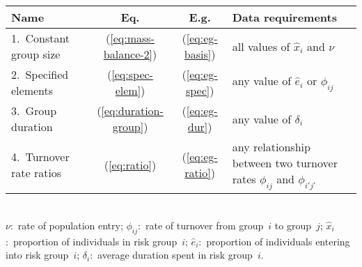 \begin{tabular}{lccl}
  \toprule
  Name                    &            Eq.            &        E.g.         & Data requirements                                                         \\
  \midrule
  1.~Constant group size  & (\ref{eq:mass-balance-2}) & (\ref{eq:eg-basis}) & all values of $\hat{x}_i$ and $\nu$                                       \\
  2.~Specified elements   &   (\ref{eq:spec-elem})    & (\ref{eq:eg-spec})  & any value of $\hat{e}_i$ or $\phi_{ij}$                                   \\
  3.~Group duration       & (\ref{eq:duration-group}) &  (\ref{eq:eg-dur})  & any value of $\delta_i$                                                   \\
  4.~Turnover rate ratios &     (\ref{eq:ratio})      & (\ref{eq:eg-ratio}) & any relationship between two turnover rates $\phi_{ij}$ and $\phi_{i'j'}$ \\
  \bottomrule
\end{tabular}\\[1em]
\footnotesize\flushleft
$\nu$:~rate of population entry;
$\phi_{ij}$:~rate of turnover from group~$i$ to group~$j$;
$\hat{x}_i$:~proportion of individuals in risk group~$i$;
$\hat{e}_i$:~proportion of individuals entering into risk group~$i$;
$\delta_i$:~average duration spent in risk group~$i$.